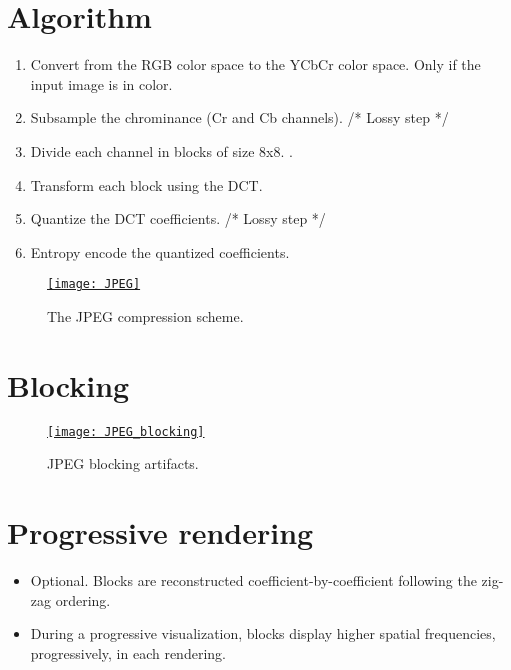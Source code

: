 \section{Algorithm}
\begin{enumerate}
\item Convert from the \gls{RGB} color space to the \gls{YCbCr} color
  space. Only if the input image is in color.
\item Subsample the chrominance (Cr and Cb channels). /* Lossy step */
\item Divide each channel in blocks of size 8x8. .
\item Transform each block using the \gls{DCT}.
\item Quantize the \gls{DCT} coefficients. /* Lossy step */
\item Entropy encode the quantized coefficients.
\end{enumerate}

\begin{figure}[H]
  \vspace{-2ex}
  \centering
  \href{https://link.springer.com/article/10.1007/s40799-019-00358-4}{\texttt{[image: JPEG]}}
  \caption{The \gls{JPEG} compression scheme.}
  \label{fig:JPEG_compressor}
\end{figure}

\section{Blocking}
\begin{figure}[H]
  \vspace{-2ex}
  \centering
  \href{https://thesai.org/Publications/ViewPaper?Volume=6&Issue=4&Code=ijacsa&SerialNo=16}{\texttt{[image: JPEG\_blocking]}}
  \caption{\gls{JPEG} blocking artifacts.}
  \label{fig:JPEG_blocking}
\end{figure}

\section{Progressive rendering}
\begin{itemize}
\item Optional. Blocks are reconstructed coefficient-by-coefficient following the zig-zag ordering.
\item During a progressive visualization, blocks display higher
  spatial frequencies, progressively, in each rendering.
\end{itemize}

